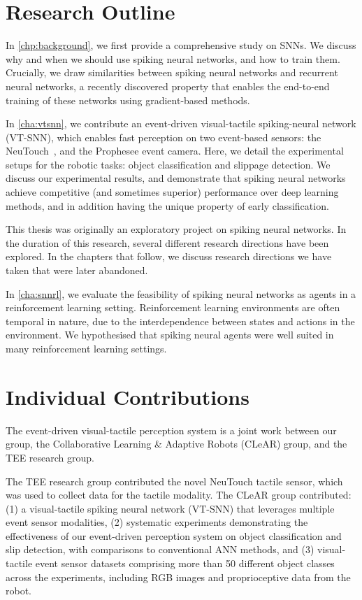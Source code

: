 \documentclass[fyp]{socreport}
\begin{document}
\section{Research Outline}

In \autoref{chp:background}, we first provide a comprehensive study on SNNs. We
discuss why and when we should use spiking neural networks, and how to train
them. Crucially, we draw similarities between spiking neural networks and
recurrent neural networks, a recently discovered property that enables the
end-to-end training of these networks using gradient-based methods.

In \autoref{cha:vtsnn}, we contribute an event-driven visual-tactile
spiking-neural network (VT-SNN), which enables fast perception on two
event-based sensors: the NeuTouch~\cite{aiskinLee}, and the Prophesee event
camera. Here, we detail the experimental setups for the robotic tasks: object
classification and slippage detection. We discuss our experimental results, and
demonstrate that spiking neural networks achieve competitive (and sometimes
superior) performance over deep learning methods, and in addition having the
unique property of early classification.

This thesis was originally an exploratory project on spiking neural networks.
In the duration of this research, several different research directions have
been explored. In the chapters that follow, we discuss research directions we
have taken that were later abandoned.

In \autoref{cha:snnrl}, we evaluate the feasibility of spiking neural networks
as agents in a reinforcement learning setting. Reinforcement learning
environments are often temporal in nature, due to the interdependence between
states and actions in the environment. We hypothesised that spiking neural
agents were well suited in many reinforcement learning settings.

\section{Individual Contributions}
The event-driven visual-tactile perception system is a joint work between our
group, the Collaborative Learning \& Adaptive Robots (CLeAR) group, and the TEE
research group.

The TEE research group contributed the novel NeuTouch tactile sensor, which was
used to collect data for the tactile modality. The CLeAR group contributed: (1) a
visual-tactile spiking neural network (VT-SNN) that leverages multiple event
sensor modalities, (2) systematic experiments demonstrating the effectiveness of
our event-driven perception system on object classification and slip detection,
with comparisons to conventional ANN methods, and (3) visual-tactile event
sensor datasets comprising more than 50 different object classes across the
experiments, including RGB images and proprioceptive data from the robot.
\end{document}

